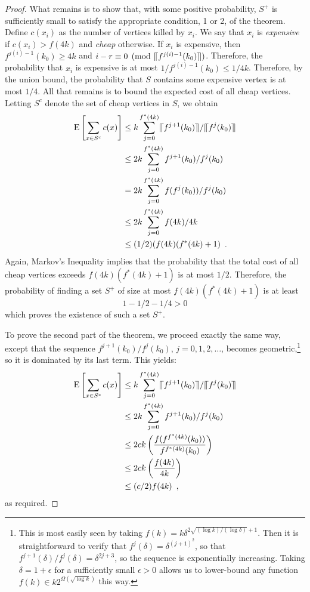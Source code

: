 \documentclass{sig-alternate}
\newcommand{\upen}[1]{\llceil#1\rrceil}
\begin{document}
\begin{proof}
  What remains is to show that, with some positive probability, $S^+$
  is sufficiently small to satisfy the appropriate condition, 1 or 2,
  of the theorem.  Define $c(x_i)$ as the number of vertices killed by
  $x_i$.  We say that $x_i$ is \emph{expensive} if $c(x_i) > f(4k)$ and
  \emph{cheap} otherwise.  If $x_i$ is expensive, then $f^{j(i)-1}(k_0)\ge
  4k$ and $i-r\equiv 0 \pmod{\upen{f^{j(i)-1}(k_0)}}$.  Therefore,
  the probability that $x_i$ is expensive is at most $1/f^{j(i)-1}(k_0)
  \le 1/4k$.  Therefore, by the union bound, the probability that $S$
  contains some expensive vertex is at most $1/4$.  All that remains
  is to bound the expected cost of all cheap vertices. Letting $S^c$
  denote the set of cheap vertices in $S$, we obtain
  \begin{align*}
     \E\left[\sum_{x\in S^c} c(x)\right] 
      & \le  k \sum_{j=0}^{f^*(4k)} \upen{f^{j+1}(k_0)}/\upen{f^j(k_0)} \\
      & \le  2k \sum_{j=0}^{f^*(4k)} f^{j+1}(k_0)/f^j(k_0) \\
      & =  2k \sum_{j=0}^{f^*(4k)} f(f^{j}(k_0))/f^j(k_0) \\
      & \le  2k \sum_{j=0}^{f^*(4k)} f(4k)/4k 
           \\
      & \le  (1/2)(f(4k)(f^*(4k)+1) \enspace .
  \end{align*}
  Again, Markov's Inequality implies that the probability that the total
  cost of all cheap vertices exceeds $f(4k)(f^*(4k)+1)$ is at most $1/2$.
  Therefore, the probability of finding a set $S^+$ of size at most
  $f(4k)(f^*(4k)+1)$ is at least
  \[  
     1 - 1/2 - 1/4 > 0 
  \]
  which proves the existence of such a set $S^+$.
  
  To prove the second part of the theorem, we proceed exactly the same
  way, except that the sequence $f^{j+1}(k_0)/f^j(k_0)$,
  $j=0,1,2,\ldots$, becomes
  geometric,\footnote{This is most easily seen by taking $f(k)
  = k\delta^{2\sqrt{(\log k)/(\log\delta)}+1}$.  Then it is
  straightforward to verify that $f^j(\delta) = \delta^{(j+1)^2}$, so
  that $f^{j+1}(\delta)/f^j(\delta)= \delta^{2j+3}$, so the sequence
  is exponentially increasing.  Taking $\delta = 1+\epsilon$ for a
  sufficiently small $\epsilon>0$ allows us to lower-bound any function
  $f(k)\in k2^{\Omega(\sqrt{\log k})}$ this way.} so it is dominated by
  its last term.  This yields:
  \begin{align*}
  \E\left[\sum_{x\in S^c} c(x)\right] 
      & \le  k \sum_{j=0}^{f^*(4k)} \upen{f^{j+1}(k_0)}/\upen{f^j(k_0)} \\
      & \le  2k \sum_{j=0}^{f^*(4k)} f^{j+1}(k_0)/f^j(k_0) \\
      & \le  2ck\left(\frac{f(f^{f^*(4k)}(k_0))}{f^{f^*(4k)}(k_0)}\right) 
            \\
      & \le  2ck\left(\frac{f(4k)}{4k}\right) 
            \\
      & \le  (c/2)f(4k) \enspace ,
  \end{align*}
  as required.
\end{proof}
\end{document}
